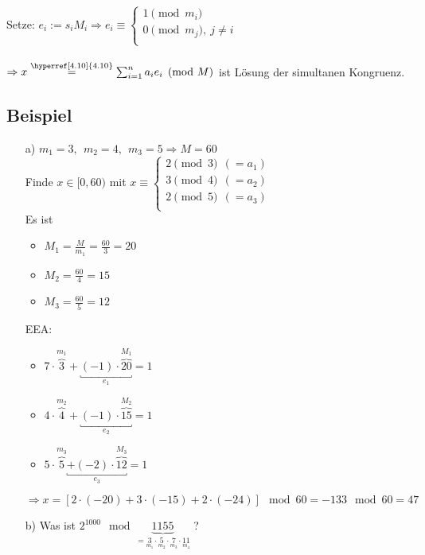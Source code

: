 \documentclass[12pt,titlepage, pdf]{article}
\renewcommand{\>}{\rightarrow}
\renewcommand{\*}{\cdot}
\begin{document}
	      Setze: $e_i := s_i M_i \Rightarrow e_i \equiv \begin{cases*}
	      1 \pmod{m_i} \\
	      0 \pmod{m_j},~ j \neq i\\
	\end{cases*}$ \\
	\\
	$\Rightarrow x \overset{\textrm{\hyperref[4.10]{4.10}}}{=} \sum_{i = 1}^{n}a_i e_i \pmod{M} $ ist Lösung der simultanen Kongruenz.
	\subsection{Beispiel}
	\begin{itemize}
		\item[a)] $m_1 = 3, ~~m_2 = 4, ~~m_3 = 5 \Rightarrow M = 60$\\
		      Finde $x \in [0,60)$ mit $x \equiv \begin{cases*}
		      	2 \pmod 3~~(=a_1)\\
		      	3 \pmod 4~~(=a_2)\\
		      	2 \pmod 5~~(=a_3)\\
		      	\end{cases*}$ \\
		      	Es ist 
		      	\begin{itemize}
		      		\item $M_1 = \frac{M}{m_1} = \frac{60}{3} = 20$ 
		      		\item  $M_2 = \frac{60}{4} = 15$
		      		\item $M_3 = \frac{60}{5} = 12$ 
		      	\end{itemize}
		      	EEA: 
		      	\begin{itemize}
		      		\item $7 \cdot \overbrace{3}^{m_1} + \underbracket{(-1) \cdot \overbrace{20}^{M_1}}_{e_1} = 1$
		      		\item $4 \cdot \overbrace{4}^{m_2} + \underbracket{(-1) \cdot \overbrace{15}^{M_2}}_{e_2} = 1$
		      		\item $5 \cdot \overbrace{5}^{m_3} \underbracket{+ (-2) \cdot \overbrace{12}^{M_3}}_{e_3} = 1$
		      	\end{itemize}
		      	$\Rightarrow x = [2 \cdot (-20) + 3 \cdot (-15) + 2 \cdot (-24)] \mod 60  =-133\mod 60= 47$
		      	\item[b)] Was ist $2^{1000} \mod \underbrace{1155}_{=\underset{m_1}{3} \cdot \underset{m_2}{5} \cdot \underset{m_3}{7} \cdot \underset{m_4}{11}}$ ?

\end{itemize}
\end{document}
